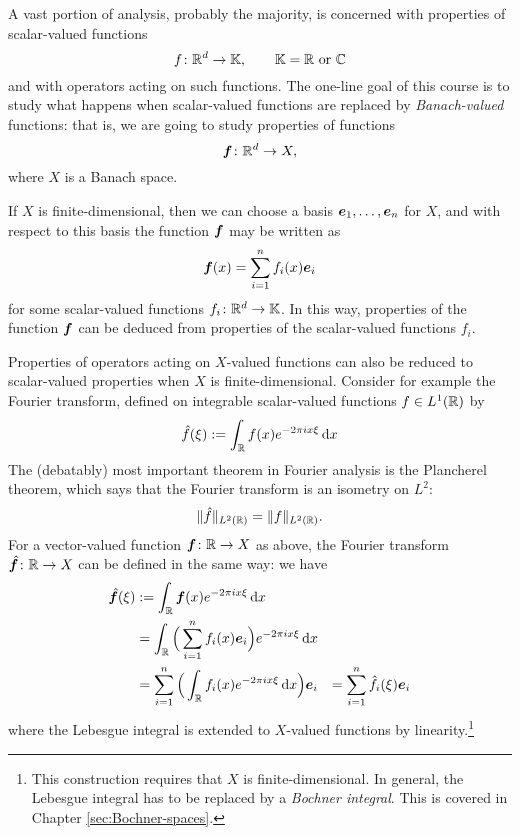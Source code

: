 A vast portion of analysis, probably the majority, is concerned with properties of scalar-valued functions
\begin{equation*}
  f \colon \mathbb{R}^{d} \rightarrow \mathbb{K}, \qquad \mathbb{K} = \text{$\mathbb{R}$ or $\mathbb{C}$}
\end{equation*}
and with operators acting on such functions.
The one-line goal of this course is to study what happens when scalar-valued functions are replaced by \emph{Banach-valued} functions: that is, we are going to study properties of functions
\begin{equation*}
  \bm{f} \colon \mathbb{R}^{d} \rightarrow X,
\end{equation*}
where $X$ is a Banach space.

If $X$ is finite-dimensional, then we can choose a basis $\bm{e}_{1}, \ldots, \bm{e}_{n}$ for $X$, and with respect to this basis the function $\bm{f}$ may be written as
\begin{equation*}
  \bm{f}(x) = \sum_{i=1}^{n} f_{i}(x) \bm{e}_{i}
\end{equation*}
for some scalar-valued functions $f_{i} \colon \mathbb{R}^{d} \rightarrow \mathbb{K}$.
In this way, properties of the function $\bm{f}$ can be deduced from properties of the scalar-valued functions $f_{i}$.

Properties of operators acting on $X$-valued functions can also be reduced to scalar-valued properties when $X$ is finite-dimensional.
Consider for example the Fourier transform, defined on integrable scalar-valued functions $f \in L^1(\mathbb{R})$ by
\begin{equation*}
  \hat{f}(\xi) := \int_{\mathbb{R}} f(x) e^{-2\pi i x \xi} \, \mathrm{d} x
\end{equation*}
The (debatably) most important theorem in Fourier analysis is the Plancherel theorem, which says that the Fourier transform is an isometry on $L^2$:
\begin{equation*}
  \|\hat{f}\|_{L^2(\mathbb{R})} = \|f\|_{L^2(\mathbb{R})}.
\end{equation*}
For a vector-valued function $\bm{f} \colon \mathbb{R} \rightarrow X$ as above, the Fourier transform $\hat{\bm{f}} \colon \mathbb{R} \rightarrow X$ can be defined in the same way: we have
\begin{equation*}
  \begin{aligned}
    \hat{\bm{f}}(\xi)
    &:= \int_{\mathbb{R}} \bm{f}(x) e^{-2\pi i x \xi} \, \mathrm{d} x \\
    &= \int_{\mathbb{R}} \Big( \sum_{i=1}^{n} f_{i}(x) \bm{e}_{i} \Big) e^{-2\pi i x \xi} \, \mathrm{d} x \\
    &= \sum_{i=1}^{n} \Big(\int_{\mathbb{R}} f_{i}(x) e^{-2\pi i x \xi} \, \mathrm{d} x \Big) \bm{e}_{i}
    &= \sum_{i=1}^{n} \hat{f_{i}}(\xi) \bm{e}_{i}
  \end{aligned}
\end{equation*}
where the Lebesgue integral is extended to $X$-valued functions by linearity.\footnote{This construction requires that $X$ is finite-dimensional. In general, the Lebesgue integral has to be replaced by a \emph{Bochner integral}. This is covered in Chapter \ref{sec:Bochner-spaces}.}



